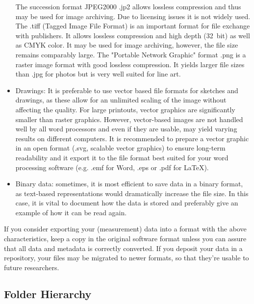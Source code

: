 \begin{itemize}
        The succession format JPEG2000 .jp2 allows lossless compression and thus
        may be used for image archiving. Due to licensing issues it is not
        widely used. The .tiff (Tagged Image File Format) is an important format
        for file exchange with publishers. It allows lossless compression and
        high depth (32 bit) as well as CMYK color. It may be used for image
        archiving, however, the file size remains comparably large. The
        "Portable Network Graphic" format .png is a raster image format with
        good lossless compression. It yields larger file sizes than .jpg for
        photos but is very well suited for line art.
  \item Drawings: It is preferable to use vector based file formats for sketches
        and drawings, as these allow for an unlimited scaling of the image
        without affecting the quality. For large printouts, vector graphics are
        significantly smaller than raster graphics. However, vector-based images
        are not handled well by all word processors and even if they are usable,
        may yield varying results on different computers. It is recommended to
        prepare a vector graphic in an open format (.svg, scalable vector
        graphics) to ensure long-term readability and it export it to the file
        format best suited for your word processing software (e.g. .emf for
        Word, .eps or .pdf for LaTeX).
  \item Binary data: sometimes, it is most efficient to save data in a binary
        format, as text-based representations would dramatically increase the
        file size. In this case, it is vital to document how the data is stored
        and preferably give an example of how it can be read again.
\end{itemize}

\noindent If you consider exporting your (measurement) data into a format
with the above characteristics, keep a copy in the original software format
unless you can assure that all data and metadata is correctly converted. If you
deposit your data in a repository, your files may be migrated to newer formats,
so that they’re usable to future researchers.

\subsection{Folder Hierarchy}

